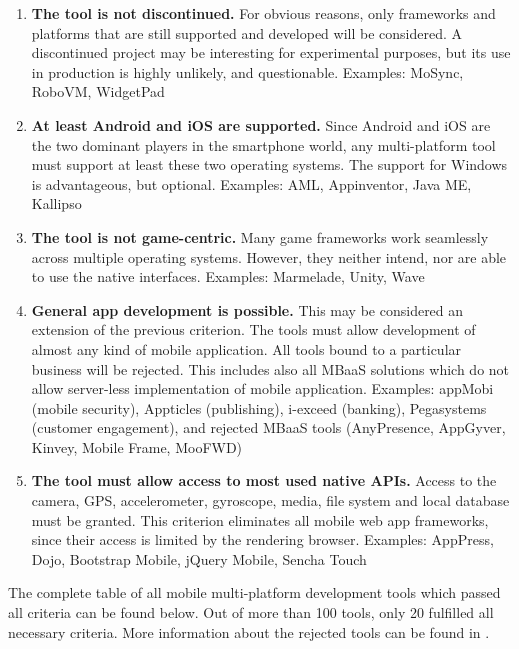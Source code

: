 \documentclass[english,master,public,dept460,male,cpdeclaration,oneside]{diploma}
\begin{document}
\begin{enumerate}
	\item \textbf{The tool is not discontinued.}
	For obvious reasons, only frameworks and platforms that are still supported and developed will be considered. A discontinued project may be interesting for experimental purposes, but its use in production is highly unlikely, and questionable.
	Examples: MoSync, RoboVM, WidgetPad
	\item \textbf{At least Android and iOS are supported.}
	Since Android and iOS are the two dominant players in the smartphone world, any multi-platform tool must support at least these two operating systems. The support for Windows is advantageous, but optional. 
	Examples: AML, Appinventor, Java ME, Kallipso
	\item \textbf{The tool is not game-centric.}
	Many game frameworks work seamlessly across multiple operating systems. However, they neither intend, nor are able to use the native interfaces.
	Examples: Marmelade, Unity, Wave
	\item \textbf{General app development is possible.}
	This may be considered an extension of the previous criterion. The tools must allow development of almost any kind of mobile application. All tools bound to a particular business will be rejected. This includes also all MBaaS solutions which do not allow server-less implementation of mobile application.
	Examples: appMobi (mobile security), Appticles (publishing), i-exceed (banking), Pegasystems (customer engagement), and rejected MBaaS tools (AnyPresence, AppGyver, Kinvey, Mobile Frame, MooFWD)
	\item \textbf{The tool must allow access to most used native APIs.}
	Access to the camera, GPS, accelerometer, gyroscope, media, file system and local database must be granted. This criterion eliminates all mobile web app frameworks, since their access is limited by the rendering browser.
	Examples: AppPress, Dojo, Bootstrap Mobile, jQuery Mobile, Sencha Touch
\end{enumerate}

The complete table of all mobile multi-platform development tools which passed all criteria can be found below. Out of more than 100 tools, only 20 fulfilled all necessary criteria. More information about the rejected tools can be found in \cite{aarhus}. 
\end{document}
